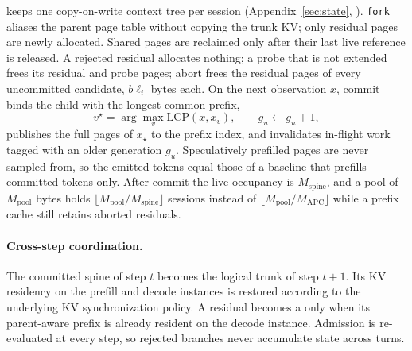 \sys keeps one copy-on-write context tree per session (Appendix~\ref{sec:state}, ).
\texttt{fork} aliases the parent page table without copying the trunk KV; only residual pages are newly allocated.
Shared pages are reclaimed only after their last live reference is released.
A rejected residual allocates nothing; a probe that is not extended frees its residual and probe pages; abort frees the residual pages of every uncommitted candidate, $b\ell_i$ bytes each.
On the next observation $x$, commit binds the child with the longest common prefix,
\begin{equation}
\label{eq:lcp}
v^\star=\arg\max_{v}\mathrm{LCP}(x,x_v),\qquad g_u\leftarrow g_u+1,
\end{equation}
publishes the full pages of $x_\star$ to the prefix index, and invalidates in-flight work tagged with an older generation $g_u$.
Speculatively prefilled pages are never sampled from, so the emitted tokens equal those of a baseline that prefills committed tokens only.
After commit the live occupancy is $M_{\mathrm{spine}}$, and a pool of $M_{\mathrm{pool}}$ bytes holds $\lfloor M_{\mathrm{pool}}/M_{\mathrm{spine}}\rfloor$ sessions instead of $\lfloor M_{\mathrm{pool}}/M_{\mathrm{APC}}\rfloor$ while a prefix cache still retains aborted residuals.

\paragraph{Cross-step coordination.}
The committed spine of step $t$ becomes the logical trunk of step $t{+}1$.
Its KV residency on the prefill and decode instances is restored according to the underlying KV synchronization policy.
A residual becomes a \Hit{} only when its parent-aware prefix is already resident on the decode instance.
Admission is re-evaluated at every step, so rejected branches never accumulate state across turns.

